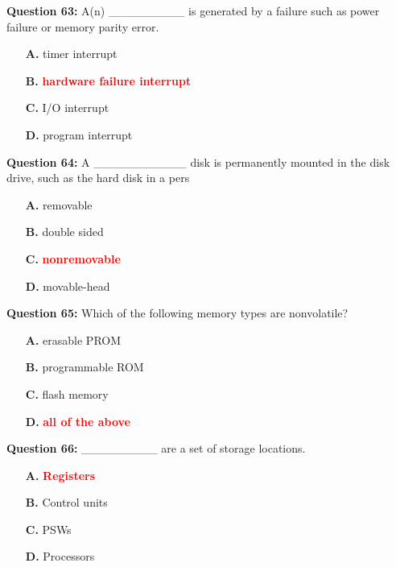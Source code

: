 \documentclass[12pt,a4paper]{article}
\begin{document}
\vspace{0.5cm}

\textbf{Question 63:} A(n) _________ is generated by a failure such as power failure or memory parity error.

\begin{itemize}
    \item[\textbf{A.}] timer interrupt
    \item[\textbf{B.}] \textcolor{red}{\textbf{hardware failure interrupt}}
    \item[\textbf{C.}] I/O interrupt
    \item[\textbf{D.}] program interrupt
\end{itemize}

\vspace{0.5cm}

\textbf{Question 64:} A ___________ disk is permanently mounted in the disk drive, such as the hard disk in a pers

\begin{itemize}
    \item[\textbf{A.}] removable
    \item[\textbf{B.}] double sided
    \item[\textbf{C.}] \textcolor{red}{\textbf{nonremovable}}
    \item[\textbf{D.}] movable-head
\end{itemize}

\vspace{0.5cm}

\textbf{Question 65:} Which of the following memory types are nonvolatile?

\begin{itemize}
    \item[\textbf{A.}] erasable PROM
    \item[\textbf{B.}] programmable ROM
    \item[\textbf{C.}] flash memory
    \item[\textbf{D.}] \textcolor{red}{\textbf{all of the above}}
\end{itemize}

\vspace{0.5cm}

\textbf{Question 66:} _________ are a set of storage locations.

\begin{itemize}
    \item[\textbf{A.}] \textcolor{red}{\textbf{Registers}}
    \item[\textbf{B.}] Control units
    \item[\textbf{C.}] PSWs
    \item[\textbf{D.}] Processors
\end{itemize}
\end{document}
